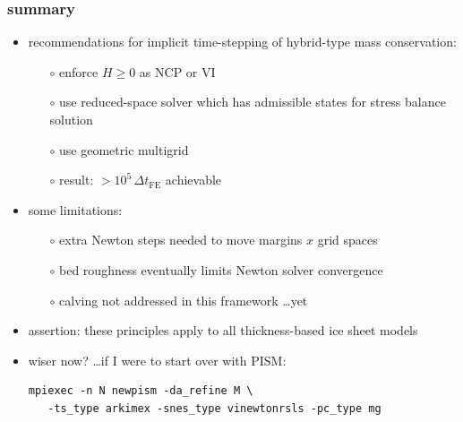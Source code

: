 \documentclass[hide notes,intlimits,usenames,dvipsnames]{beamer}
\begin{document}
\begin{frame}[fragile]
\frametitle{summary}
\begin{itemize}
\item recommendations for implicit time-stepping of hybrid-type mass conservation:
  \begin{itemize}
  \item[$\circ$] enforce $H\ge 0$ as NCP or VI
  \item[$\circ$] use reduced-space solver which has admissible states for stress balance solution
  \item[$\circ$] use geometric multigrid
  \item[$\circ$] result: $>10^5 \,\Delta t_{\text{FE}}$ achievable
  \end{itemize}
\item some limitations:
  \begin{itemize}
  \item[$\circ$] extra Newton steps needed to move margins $x$ grid spaces
  \item[$\circ$] bed roughness eventually limits Newton solver convergence
  \item[$\circ$] calving not addressed in this framework \dots yet
  \end{itemize}

\bigskip
\item assertion: these principles apply to all thickness-based ice sheet models
\item wiser now? \dots if I were to start over with PISM:
\scriptsize
\begin{verbatim}
mpiexec -n N newpism -da_refine M \
   -ts_type arkimex -snes_type vinewtonrsls -pc_type mg
\end{verbatim}
\end{itemize}
\end{frame}
\end{document}
